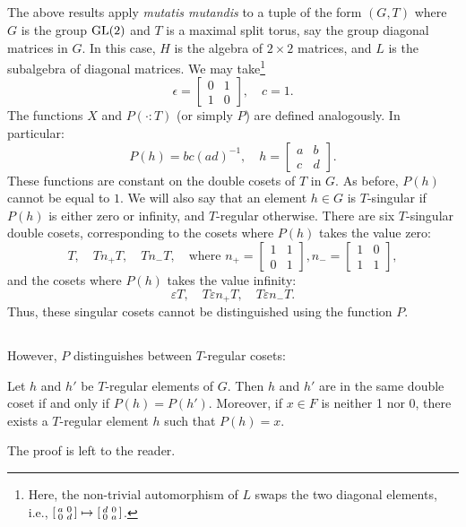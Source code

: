 \subsection{}
The above results apply \emph{mutatis mutandis} to a tuple of the form $(G, T)$ where $G$ is the group $\mathrm{GL}(2)$ and $T$ is a maximal split torus, say the group diagonal matrices in $G$.
In this case, $H$ is the algebra of $2 \times 2$ matrices, and $L$ is the subalgebra of diagonal matrices. We may take\footnote{Here, the non-trivial automorphism of $L$ swaps the two diagonal elements, i.e., $[\begin{smallmatrix} a & 0 \\ 0 & d \end{smallmatrix}] \mapsto [\begin{smallmatrix} d & 0 \\ 0 & a \end{smallmatrix}]$.}
\[
\epsilon = \begin{bmatrix}
    0 & 1 \\ 1 & 0
\end{bmatrix},
\quad c = 1.
\]
The functions $X$ and $P(\cdot :T)$ (or simply $P$) are defined analogously.
In particular:
\[
P(h)  = bc{(ad)}^{-1}, \quad h = \begin{bmatrix}
    a & b \\ c & d
\end{bmatrix}.
\]
These functions are constant on the double cosets of $T$ in $G$.
As before, $P(h)$ cannot be equal to $1$.
We will also say that an element $h \in G$ is $T$-singular if $P(h)$ is either zero or infinity, and $T$-regular otherwise.
There are six $T$-singular double cosets, corresponding to the cosets where $P(h)$ takes the value zero:
\begin{equation}
    T, \quad Tn_+T, \quad Tn_{-}T, \quad \text{where } n_{+} = \begin{bmatrix}
        1 & 1 \\ 0 & 1
    \end{bmatrix}, n_{-} = \begin{bmatrix}
        1 & 0 \\ 1 & 1
    \end{bmatrix},
\end{equation}
and the cosets where $P(h)$ takes the value infinity:
\begin{equation}
\varepsilon T, \quad T \varepsilon n_{+} T, \quad T\varepsilon n_{-} T.
\end{equation}
Thus, these singular cosets cannot be distinguished using the function $P$.

\subsection{}
However, $P$ distinguishes between $T$-regular cosets:
\begin{proposition}
Let $h$ and $h'$ be $T$-regular elements of $G$.
Then $h$ and $h'$ are in the same double coset if and only if $P(h) = P(h')$. Moreover, if $x \in F$ is neither 1 nor 0, there exists a $T$-regular element $h$ such that $P(h) = x$.
\end{proposition}
The proof is left to the reader.
